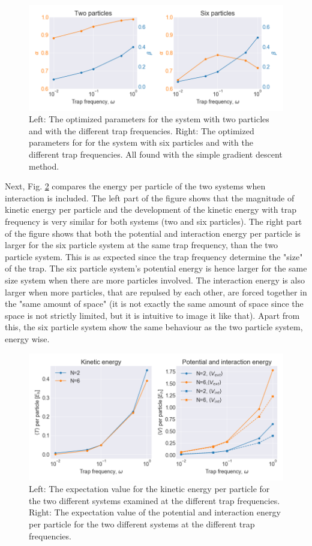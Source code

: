 \begin{figure}[H]
\center
\includegraphics[width=0.85\linewidth]{../Results/parameters_compared}\caption{Left: The optimized parameters for the system with two particles and with the different trap frequencies. Right: The optimized parameters for  for the system with six particles and with the different trap frequencies. All found with the simple gradient descent method.}\label{fig:parameters_compared}
\end{figure}

Next, Fig. \ref{fig:energy_per_particle_compared} compares the energy per particle of the two systems when interaction is included. The left part of the figure shows that the magnitude of kinetic energy per particle and the development of the kinetic energy with trap frequency is very similar for both systems (two and six particles). The right part of the figure shows that both the potential and interaction energy per particle is larger for the six particle system at the same trap frequency, than the two particle system. This is as expected since the trap frequency determine the "size" of the trap. The six particle system's potential energy is hence larger for the same size system when there are more particles involved. The interaction energy is also larger when more particles, that are repulsed by each other, are forced together in the "same amount of space" (it is not exactly the same amount of space since the space is not strictly limited, but it is intuitive to image it like that). Apart from this, the six particle system show the same behaviour as the two particle system, energy wise. 

\begin{figure}[H]
\center
\includegraphics[width=0.85\linewidth]{../Results/energy_per_particle_compared}\caption{Left: The expectation value for the kinetic energy per particle for the two different systems examined at the different trap frequencies. Right: The expectation value of the potential and interaction energy per particle for the two different systems at the different trap frequencies.  }\label{fig:energy_per_particle_compared}
\end{figure}

